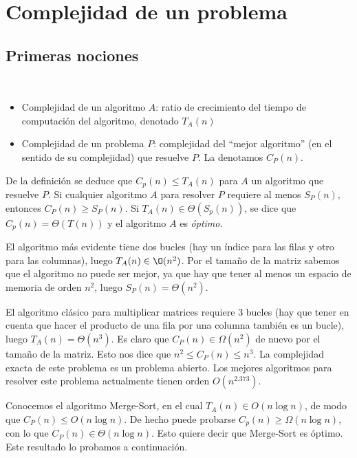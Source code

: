\documentclass[AL.tex]{subfiles}
\begin{document}

\chapter{Complejidad de un problema}

\section{Primeras nociones}
\begin{defi}\
\begin{itemize}
\item Complejidad de un algoritmo $A$: ratio de crecimiento del tiempo de computación del algoritmo, denotado $T_A(n)$
\item Complejidad de un problema $P$: complejidad del ``mejor algoritmo'' (en el sentido de su complejidad) que resuelve $P$. La denotamos $C_P(n)$. 
\end{itemize}
\end{defi}
De la definición se deduce que $C_p(n)\leq T_A(n)$ para $A$ un algoritmo que resuelve $P$.  Si cualquier algoritmo $A$ para resolver $P$ requiere al menos $S_P(n)$, entonces $C_P(n)\geq S_P(n)$. Si $T_A(n)\in\Theta(S_p(n))$, se dice que $C_p(n)=\Theta(T(n))$ y el algoritmo $A$ es \emph{óptimo}. 

\begin{ej}
El algoritmo más evidente tiene dos bucles (hay un índice para las filas y otro para las columnas), luego $T_A(n)\in\O(n^2)$. Por el tamaño de la matriz sabemos que el algoritmo no puede ser mejor, ya que hay que tener al menos un espacio de memoria de orden $n^2$, luego $S_P(n)=\Theta(n^2)$. 
\end{ej}

\begin{ej}
El algoritmo clásico para multiplicar matrices requiere 3 bucles (hay que tener en cuenta que hacer el producto de una fila por una columna también es un bucle), luego $T_A(n)=\Theta(n^3)$. Es claro que $C_P(n)\in\Omega(n^2)$ de nuevo por el tamaño de la matriz. Esto nos dice que $n^2\leq C_P(n)\leq n^3$. La complejidad exacta de este problema es un problema abierto. Los mejores algoritmos para resolver este problema actualmente tienen orden $O(n^{2.373})$. 
\end{ej}

\begin{ej}[Sorting]
Conocemos el algoritmo Merge-Sort, en el cual $T_A(n)\in O(n\log n)$, de modo que $C_P(n)\leq O(n\log n)$. De hecho puede probarse $C_p(n)\geq\Omega(n\log n)$, con lo que $C_P(n)\in\Theta(n\log n)$. Esto quiere decir que Merge-Sort es óptimo. Este resultado lo probamos a continuación.

\end{ej}
\end{document}
